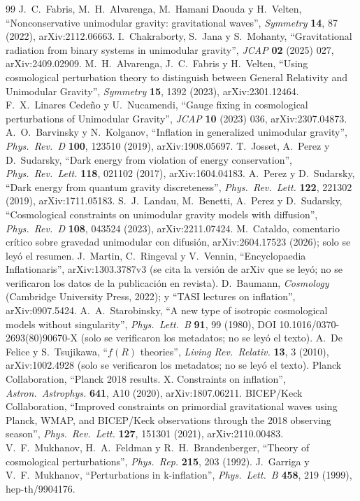 \begin{thebibliography}{99}
 J.~C.~Fabris, M.~H.~Alvarenga, M.~Hamani Daouda y H.~Velten, ``Nonconservative unimodular gravity: gravitational waves'', \emph{Symmetry} \textbf{14}, 87 (2022), arXiv:2112.06663.
 I.~Chakraborty, S.~Jana y S.~Mohanty, ``Gravitational radiation from binary systems in unimodular gravity'', \emph{JCAP} \textbf{02} (2025) 027, arXiv:2409.02909.
 M.~H.~Alvarenga, J.~C.~Fabris y H.~Velten, ``Using cosmological perturbation theory to distinguish between General Relativity and Unimodular Gravity'', \emph{Symmetry} \textbf{15}, 1392 (2023), arXiv:2301.12464.
 F.~X.~Linares Cedeño y U.~Nucamendi, ``Gauge fixing in cosmological perturbations of Unimodular Gravity'', \emph{JCAP} \textbf{10} (2023) 036, arXiv:2307.04873.
 A.~O.~Barvinsky y N.~Kolganov, ``Inflation in generalized unimodular gravity'', \emph{Phys.\ Rev.\ D} \textbf{100}, 123510 (2019), arXiv:1908.05697.
 T.~Josset, A.~Perez y D.~Sudarsky, ``Dark energy from violation of energy conservation'', \emph{Phys.\ Rev.\ Lett.} \textbf{118}, 021102 (2017), arXiv:1604.04183.
 A.~Perez y D.~Sudarsky, ``Dark energy from quantum gravity discreteness'', \emph{Phys.\ Rev.\ Lett.} \textbf{122}, 221302 (2019), arXiv:1711.05183.
 S.~J.~Landau, M.~Benetti, A.~Perez y D.~Sudarsky, ``Cosmological constraints on unimodular gravity models with diffusion'', \emph{Phys.\ Rev.\ D} \textbf{108}, 043524 (2023), arXiv:2211.07424.
 M.~Cataldo, comentario crítico sobre gravedad unimodular con difusión, arXiv:2604.17523 (2026); solo se leyó el resumen.
 J.~Martin, C.~Ringeval y V.~Vennin, ``Encyclopaedia Inflationaris'', arXiv:1303.3787v3 (se cita la versión de arXiv que se leyó; no se verificaron los datos de la publicación en revista).
 D.~Baumann, \emph{Cosmology} (Cambridge University Press, 2022); y ``TASI lectures on inflation'', arXiv:0907.5424.
 A.~A.~Starobinsky, ``A new type of isotropic cosmological models without singularity'', \emph{Phys.\ Lett.\ B} \textbf{91}, 99 (1980), DOI 10.1016/0370-2693(80)90670-X (solo se verificaron los metadatos; no se leyó el texto).
 A.~De Felice y S.~Tsujikawa, ``$f(R)$ theories'', \emph{Living Rev.\ Relativ.} \textbf{13}, 3 (2010), arXiv:1002.4928 (solo se verificaron los metadatos; no se leyó el texto).
 Planck Collaboration, ``Planck 2018 results. X. Constraints on inflation'', \emph{Astron.\ Astrophys.} \textbf{641}, A10 (2020), arXiv:1807.06211.
 BICEP/Keck Collaboration, ``Improved constraints on primordial gravitational waves using Planck, WMAP, and BICEP/Keck observations through the 2018 observing season'', \emph{Phys.\ Rev.\ Lett.} \textbf{127}, 151301 (2021), arXiv:2110.00483.
 V.~F.~Mukhanov, H.~A.~Feldman y R.~H.~Brandenberger, ``Theory of cosmological perturbations'', \emph{Phys.\ Rep.} \textbf{215}, 203 (1992).
 J.~Garriga y V.~F.~Mukhanov, ``Perturbations in k-inflation'', \emph{Phys.\ Lett.\ B} \textbf{458}, 219 (1999), hep-th/9904176.
\end{thebibliography}
